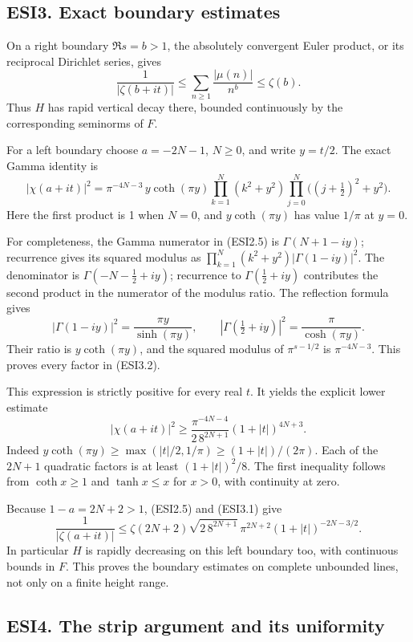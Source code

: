\subsection{ESI3. Exact boundary
estimates}\label{esi3.-exact-boundary-estimates}

On a right boundary \(\Re s=b>1\), the absolutely convergent Euler
product, or its reciprocal Dirichlet series, gives \[
\frac1{|\zeta(b+it)|}\le\sum_{n\ge1}\frac{|\mu(n)|}{n^b}
\le\zeta(b).
\tag{ESI3.1}
\] Thus \(H\) has rapid vertical decay there, bounded continuously by
the corresponding seminorms of \(F\).

For a left boundary choose \(a=-2N-1\), \(N\ge0\), and write \(y=t/2\).
The exact Gamma identity is \[
\boxed{
|\chi(a+it)|^2=
\pi^{-4N-3}\,y\coth(\pi y)
\prod_{k=1}^{N}(k^2+y^2)
\prod_{j=0}^{N}\bigl((j+\tfrac12)^2+y^2\bigr).}
\tag{ESI3.2}
\] Here the first product is 1 when \(N=0\), and \(y\coth(\pi y)\) has
value \(1/\pi\) at \(y=0\).

For completeness, the Gamma numerator in (ESI2.5) is \(\Gamma(N+1-iy)\);
recurrence gives its squared modulus as
\(\prod_{k=1}^N(k^2+y^2)|\Gamma(1-iy)|^2\). The denominator is
\(\Gamma(-N-\tfrac12+iy)\); recurrence to \(\Gamma(\tfrac12+iy)\)
contributes the second product in the numerator of the modulus ratio.
The reflection formula gives \[
|\Gamma(1-iy)|^2=\frac{\pi y}{\sinh(\pi y)},
\qquad
|\Gamma(\tfrac12+iy)|^2=\frac{\pi}{\cosh(\pi y)}.
\tag{ESI3.3}
\] Their ratio is \(y\coth(\pi y)\), and the squared modulus of
\(\pi^{s-1/2}\) is \(\pi^{-4N-3}\). This proves every factor in
(ESI3.2).

This expression is strictly positive for every real \(t\). It yields the
explicit lower estimate \[
|\chi(a+it)|^2\ge
\frac{\pi^{-4N-4}}{2\,8^{2N+1}}
(1+|t|)^{4N+3}.
\tag{ESI3.4}
\] Indeed \(y\coth(\pi y)\ge\max(|t|/2,1/\pi)\ge(1+|t|)/(2\pi)\). Each
of the \(2N+1\) quadratic factors is at least \((1+|t|)^2/8\). The first
inequality follows from \(\coth x\ge1\) and \(\tanh x\le x\) for
\(x>0\), with continuity at zero.

Because \(1-a=2N+2>1\), (ESI2.5) and (ESI3.1) give \[
\frac1{|\zeta(a+it)|}
\le \zeta(2N+2)\sqrt{2\,8^{2N+1}}\,
\pi^{2N+2}(1+|t|)^{-2N-3/2}.
\tag{ESI3.5}
\] In particular \(H\) is rapidly decreasing on this left boundary too,
with continuous bounds in \(F\). This proves the boundary estimates on
complete unbounded lines, not only on a finite height range.

\subsection{ESI4. The strip argument and its
uniformity}\label{esi4.-the-strip-argument-and-its-uniformity}

